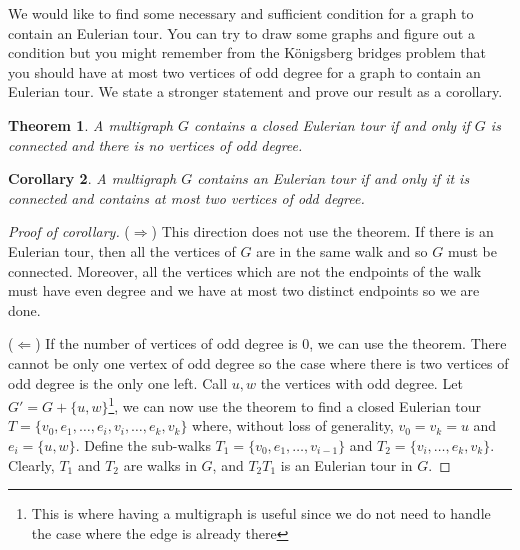 \documentclass{tufte-handout}
\newtheorem{thm}{Theorem}
\newtheorem{cor}[thm]{Corollary}
\theoremstyle{definition}
\theoremstyle{remark}
\begin{document}
We would like to find some necessary and sufficient condition for a graph to contain an Eulerian tour. You can try to draw some graphs and figure out a condition but you might remember from the K\"onigsberg bridges problem that you should have at most two vertices of odd degree for a graph to contain an Eulerian tour. We state a stronger statement and prove our result as a corollary.

\begin{thm}
	A multigraph $G$ contains a closed Eulerian tour if and only if $G$ is connected and there is no vertices of odd degree.
\end{thm}
\begin{cor}
	A multigraph $G$ contains an Eulerian tour if and only if it is connected and contains at most two vertices of odd degree.
\end{cor}
\begin{proof}[Proof of corollary]
	($\Rightarrow$) This direction does not use the theorem. If there is an Eulerian tour, then all the vertices of $G$ are in the same walk and so $G$ must be connected. Moreover, all the vertices which are not the endpoints of the walk must have even degree and we have at most two distinct endpoints so we are done.
	
	($\Leftarrow$) If the number of vertices of odd degree is 0, we can use the theorem. There cannot be only one vertex of odd degree so the case where there is two vertices of odd degree is the only one left. Call $u,w$ the vertices with odd degree. Let $G' = G+\{u,w\}$\footnote{This is where having a multigraph is useful since we do not need to handle the case where the edge is already there}, we can now use the theorem to find a closed Eulerian tour $T = \{v_0, e_1, \dots, e_i, v_i, \dots, e_k, v_k\}$ where, without loss of generality, $v_0 = v_k = u$ and $e_i = \{u,w\}$. Define the sub-walks $T_1 = \{v_0, e_1, \dots, v_{i-1}\}$ and $T_2 = \{v_i, \dots, e_k, v_k\}$. Clearly, $T_1$ and $T_2$ are walks in $G$, and $T_2T_1$ is an Eulerian tour in $G$.
\end{proof}
\end{document}
